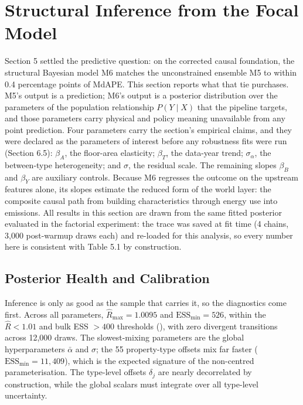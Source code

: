 \FloatBarrier
\section{Structural Inference from the Focal Model}

Section 5 settled the predictive question: on the corrected causal foundation, the structural Bayesian model M6 matches the unconstrained ensemble M5 to within 0.4 percentage points of MdAPE. This section reports what that tie purchases. M5's output is a prediction; M6's output is a posterior distribution over the parameters of the population relationship $P(Y \mid X)$ that the pipeline targets, and those parameters carry physical and policy meaning unavailable from any point prediction. Four parameters carry the section's empirical claims, and they were declared as the parameters of interest before any robustness fits were run (Section 6.5): $\beta_A$, the floor-area elasticity; $\beta_T$, the data-year trend; $\sigma_\alpha$, the between-type heterogeneity; and $\sigma$, the residual scale. The remaining slopes $\beta_B$ and $\beta_Y$ are auxiliary controls. Because M6 regresses the outcome on the upstream features alone, its slopes estimate the reduced form of the world layer: the composite causal path from building characteristics through energy use into emissions. All results in this section are drawn from the same fitted posterior evaluated in the factorial experiment: the trace was saved at fit time (4 chains, 3,000 post-warmup draws each) and re-loaded for this analysis, so every number here is consistent with Table 5.1 by construction.

\subsection{Posterior Health and Calibration}

Inference is only as good as the sample that carries it, so the diagnostics come first. Across all parameters, $\hat{R}_{\max} = 1.0095$ and $\text{ESS}_{\min} = 526$, within the $\hat{R} < 1.01$ and bulk ESS $> 400$ thresholds (), with zero divergent transitions across 12,000 draws. The slowest-mixing parameters are the global hyperparameters $\bar{\alpha}$ and $\sigma$; the 55 property-type offsets mix far faster ($\text{ESS}_{\min} = 11{,}409$), which is the expected signature of the non-centred parameterisation. The type-level offsets $\delta_j$ are nearly decorrelated by construction, while the global scalars must integrate over all type-level uncertainty.

